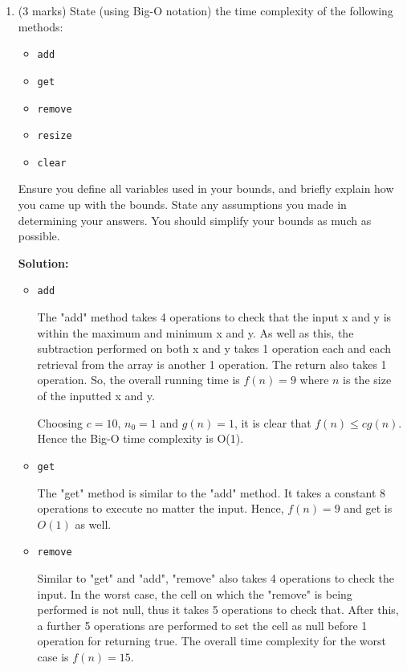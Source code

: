 \documentclass[a4,13pt]{extarticle}
\newenvironment{Solution}{\color{blue}\textbf{Solution:}}{}
\begin{document}
\begin{enumerate}
\begin{enumerate}
	      	\item (3 marks) State (using Big-O notation) the time complexity of the following methods:
	      	      	      	                      
	      	      \begin{itemize}
	      	      	\item \texttt{add}
	      	      	\item \texttt{get}
	      	      	\item \texttt{remove}
	      	      	\item \texttt{resize}
	      	      	\item \texttt{clear}
	      	      \end{itemize}
	      	      	      	                      
	      	      Ensure you define all variables used in your bounds, and briefly explain how you came up with the bounds. 
	      	      State any assumptions you made in determining your answers. You should simplify your bounds as much as possible.
	      	      
			\begin{Solution}
				\begin{itemize}
					\item \texttt{add}
					
						The "add" method takes 4 operations to check that the input x and y is within the maximum and minimum x and y. As well as this, the subtraction performed on both x and y takes 1 operation each and each retrieval from the array is another 1 operation. The return also takes 1 operation. So, the overall running time is $f(n) = 9$ where $n$ is the size of the inputted x and y.

						Choosing $c = 10$, $n_0 = 1$ and $g(n) = 1$, it is clear that $f(n) \leq cg(n)$. Hence the Big-O time complexity is O(1).
					\item \texttt{get}

						The "get" method is similar to the "add" method. It takes a constant 8 operations to execute no matter the input. Hence, $f(n) = 9$ and get is $O(1)$ as well.
					\item \texttt{remove}
					
						Similar to "get" and "add", "remove" also takes 4 operations to check the input. In the worst case, the cell on which the "remove" is being performed is not null, thus it takes 5 operations to check that. After this, a further 5 operations are performed to set the cell as null before 1 operation for returning true. The overall time complexity for the worst case is $f(n) = 15$.


\end{itemize}
\end{Solution}
\end{enumerate}
\end{enumerate}
\end{document}
